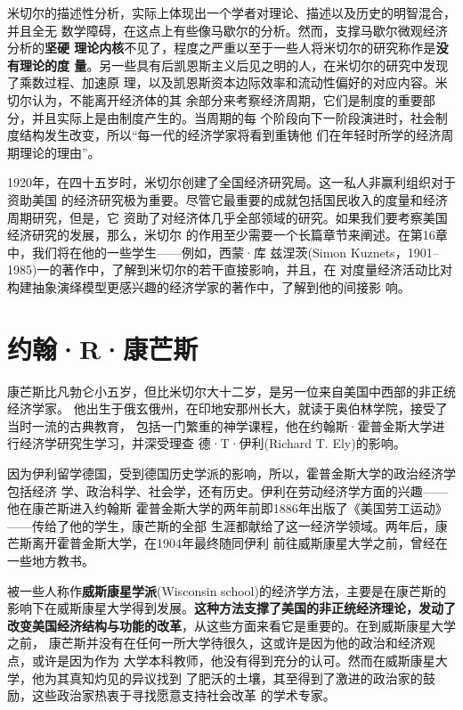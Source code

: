 米切尔的描述性分析，实际上体现出一个学者对理论、描述以及历史的明智混合，并且全无
数学障碍，在这点上有些像马歇尔的分析。然而，支撑马歇尔微观经济分析的\textbf{坚硬
  理论内核}不见了，程度之严重以至于一些人将米切尔的研究称作是\textbf{没有理论的度
  量}。另一些具有后凯恩斯主义后见之明的人，在米切尔的研究中发现了乘数过程、加速原
理，以及凯恩斯资本边际效率和流动性偏好的对应内容。米切尔认为，不能离开经济体的其
余部分来考察经济周期，它们是制度的重要部分，并且实际上是由制度产生的。当周期的每
个阶段向下一阶段演进时，社会制度结构发生改变，所以“每一代的经济学家将看到重铸他
们在年轻时所学的经济周期理论的理由”。

1920年，在四十五岁时，米切尔创建了全国经济研究局。这一私人非赢利组织对于资助美国
的经济研究极为重要。尽管它最重要的成就包括国民收入的度量和经济周期研究，但是，它
资助了对经济体几乎全部领域的研究。如果我们要考察美国经济研究的发展，那么，米切尔
的作用至少需要一个长篇章节来阐述。在第16章中，我们将在他的一些学生——例如，西蒙·库
兹涅茨(Simon Kuznets，1901--1985)一的著作中，了解到米切尔的若干直接影响，并且，在
对度量经济活动比对构建抽象演绎模型更感兴趣的经济学家的著作中，了解到他的间接影
响。

\section{约翰·R·康芒斯}

康芒斯比凡勃仑小五岁，但比米切尔大十二岁，是另一位来自美国中西部的非正统经济学家。
他出生于俄玄俄州，在印地安那州长大，就读于奥伯林学院，接受了当时一流的古典教育，
包括一门繁重的神学课程，他在约翰斯·霍普金斯大学进行经济学研究生学习，并深受理查
德·T·伊利(Richard T. Ely)的影响。

因为伊利留学德国，受到德国历史学派的影响，所以，霍普金斯大学的政治经济学包括经济
学、政治科学、社会学，还有历史。伊利在劳动经济学方面的兴趣——他在康芒斯进入约翰斯
霍普金斯大学的两年前即1886年出版了《美国劳工运动》——传给了他的学生，康芒斯的全部
生涯都献给了这一经济学领域。两年后，康芒斯离开霍普金斯大学，在1904年最终随同伊利
前往威斯康星大学之前，曾经在一些地方教书。

被一些人称作\textbf{威斯康星学派}(Wisconsin school)的经济学方法，主要是在康芒斯的
影响下在威斯康星大学得到发展。\textbf{这种方法支撑了美国的非正统经济理论，发动了
  改变美国经济结构与功能的改革}，从这些方面来看它是重要的。在到威斯康星大学之前，
康芒斯并没有在任何一所大学待很久，这或许是因为他的政治和经济观点，或许是因为作为
大学本科教师，他没有得到充分的认可。然而在威斯康星大学，他为其真知灼见的异议找到
了肥沃的土壤，其至得到了激进的政治家的鼓励，这些政治家热衷于寻找愿意支持社会改革
的学术专家。


